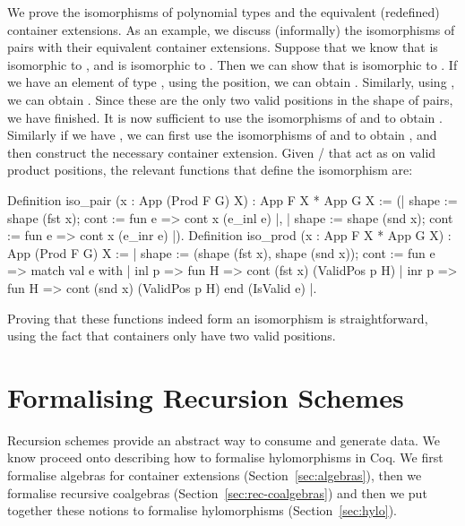 \documentclass[anonymous, a4paper, UKenglish, cleveref, autoref, thm-restate]{lipics-v2021}
\begin{document}
We prove the isomorphisms of polynomial types and the equivalent (redefined)
container extensions. As an example, we discuss (informally) the isomorphisms
of pairs with their equivalent container extensions. Suppose that we
know that  is isomorphic to , and
 is isomorphic to . Then we can
show that  is isomorphic to
.  If we have an element of type 
,
using the  position, we can obtain
.  Similarly, using , we can
obtain . Since these are the only two valid positions
in the shape of pairs, we have finished. It is now sufficient to use the
isomorphisms of  and  to
obtain . Similarly if we have ,
we can first use the isomorphisms of 
 and
 to obtain
, and then construct the necessary container
extension. Given / that act as
 on valid product positions, the relevant
functions that define the isomorphism are:
\begin{coqcode}
Definition iso_pair (x : App (Prod F G) X) : App F X * App G X :=
  ({| shape := shape (fst x); cont := fun e => cont x (e_inl e) |}, 
   {| shape := shape (snd x); cont := fun e => cont x (e_inr e) |}).
Definition iso_prod (x : App F X * App G X) : App (Prod F G) X :=
{| shape := (shape (fst x), shape (snd x));
   cont := fun e => match val e with 
                    | inl p => fun H => cont (fst x) (ValidPos p H)
                    | inr p => fun H => cont (snd x) (ValidPos p H)
                    end (IsValid e)
|}.
\end{coqcode}
Proving that these functions indeed form an isomorphism is straightforward,
using the fact that  containers only have two valid positions.

\section{Formalising Recursion Schemes}
Recursion schemes provide an abstract way to consume and generate data. We know
proceed onto describing how to formalise hylomorphisms in Coq. We first
formalise algebras for container extensions (Section~\ref{sec:algebras}), then
we formalise recursive coalgebras (Section~\ref{sec:rec-coalgebras}) and then we
put together these notions to formalise hylomorphisms (Section~\ref{sec:hylo}).
\end{document}
